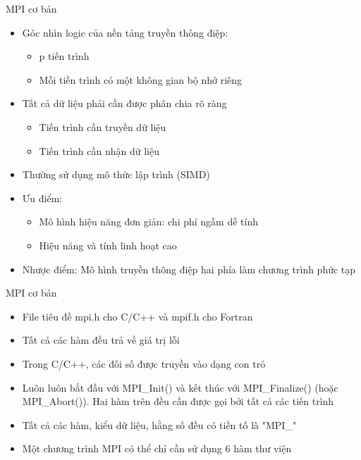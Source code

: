 \documentclass[10pt]{beamer}
\theoremstyle{remark}
\numberwithin{algocf}{section}
\numberwithin{equation}{section}
\numberwithin{dl}{section}
\numberwithin{figure}{section}
\begin{document}
\begin{frame}[shrink]{MPI cơ bản}
    \begin{itemize}
        \item Góc nhìn logic của nền tảng truyền thông điệp:
        \begin{itemize}
            \item p tiến trình
            \item Mỗi tiền trình có một không gian bộ nhớ riêng
        \end{itemize}
        \item Tất cả dữ liệu phải cần được phân chia rõ ràng
        \begin{itemize}
            \item Tiến trình cần truyền dữ liệu
            \item Tiến trình cần nhận dữ liệu
        \end{itemize}
        \item Thường sử dụng mô thức lập trình (SIMD)
        \item Ưu điểm:
        \begin{itemize}
            \item Mô hình hiệu năng đơn giản: chi phí ngầm dễ tính
            \item Hiệu năng và tính linh hoạt cao
        \end{itemize}
        \item Nhược điểm: Mô hình truyền thông điệp hai phía làm chương trình phức tạp
    \end{itemize}
\end{frame}

\begin{frame}{MPI cơ bản}
    \begin{itemize}
        \item File tiêu đề mpi.h cho C/C++ và mpif.h cho Fortran
        \item Tất cả các hàm đều trả về giá trị lỗi
        \item Trong C/C++, các đối số được truyền vào dạng con trỏ
        \item Luôn luôn bắt đầu với MPI\_Init() và kết thúc với MPI\_Finalize() (hoặc MPI\_Abort()).
        Hai hàm trên đều cần được gọi bởi tất cả các tiến trình
        \item Tất cả các hàm, kiểu dữ liệu, hằng số đều có tiền tố là "MPI\_"
        \item Một chương trình MPI có thể chỉ cần sử dụng 6 hàm thư viện
    \end{itemize}
\end{frame}
\end{document}

